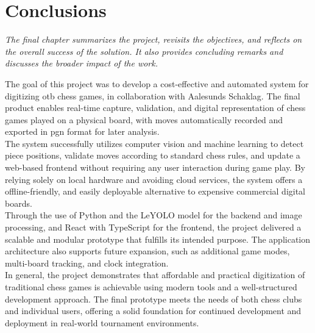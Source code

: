 \chapter{Conclusions}

\begin{center}
    \textit{The final chapter summarizes the project, revisits the objectives, and reflects on the overall success of the solution. It also provides concluding remarks and discusses the broader impact of the work.}
\end{center}

The goal of this project was to develop a cost-effective and automated system for digitizing \gls{otb} chess games, in collaboration with Aalesunds Schaklag. The final product enables real-time capture, validation, and digital representation of chess games played on a physical board, with moves automatically recorded and exported in \gls{pgn} format for later analysis. \\

The system successfully utilizes computer vision and machine learning to detect piece positions, validate moves according to standard chess rules, and update a web-based frontend without requiring any user interaction during game play. By relying solely on local hardware and avoiding cloud services, the system offers a offline-friendly, and easily deployable alternative to expensive commercial digital boards. \\

Through the use of Python and the LeYOLO model for the backend and image processing, and React with TypeScript for the frontend, the project delivered a scalable and modular prototype that fulfills its intended purpose. The application architecture also supports future expansion, such as additional game modes, multi-board tracking, and clock integration. \\

In general, the project demonstrates that affordable and practical digitization of traditional chess games is achievable using modern tools and a well-structured development approach. The final prototype meets the needs of both chess clubs and individual users, offering a solid foundation for continued development and deployment in real-world tournament environments.